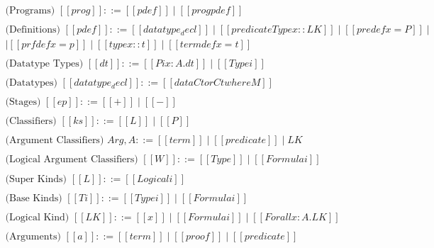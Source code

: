 


\renewcommand{\Sepdrulename}[1]{\scriptsize \textsc{#1}}
\renewcommand{\SepUdrulename}[1]{\scriptsize \textsc{#1}}

\begin{center}
  \small
  \begin{math}
    \begin{array}{llllllllllllllll}
      \text{(Programs) }    [[prog]] ::= [[pdef]] \mid [[prog pdef]]\\
      \\
      \text{(Definitions) } [[pdef]] ::= [[datatype_decl]] \mid [[predicateType x :: LK]] \mid
      [[predef x = P]] \mid \\
      [[theorem x :: P]] \mid [[prfdef x = p]] \mid [[type x :: t]] \mid [[termdef x = t]] \\
      \\
      \text{(Datatype Types) } [[dt]] ::= [[Pi x : A . dt]] \mid [[Type i]]\\
      \\
      \text{(Datatypes) }   [[datatype_decl]] ::= [[data Ctor C t where M]]\\
      \\
      \text{(Stages) }      [[ep]]   ::= [[+]] \mid [[-]]\\
      \\
      \text{(Classifiers) } [[ks]]   ::= [[L]] \mid [[P]]\\
      \\
      \text{(Argument Classifiers) } Arg, A ::= [[term]] \mid [[predicate]] \mid LK\\
      \\
      \text{(Logical Argument Classifiers) } [[W]] ::= [[Type]] \mid [[Formula i]]\\
      \\
      \text{(Super Kinds) } [[L]] ::= [[Logical i]]\\
      \\
      \text{(Base Kinds) }  [[Ti]] ::= [[Type i]] \mid [[Formula i]]\\
      \\
      \text{(Logical Kind) } [[LK]] ::= [[x]] \mid [[Formula i]] \mid [[Forall x : A.LK]]\\
      \\
      \text{(Arguments) } [[a]] ::= [[term]] \mid [[proof]] \mid [[predicate]]\\

\end{array}
\end{math}
\end{center}
